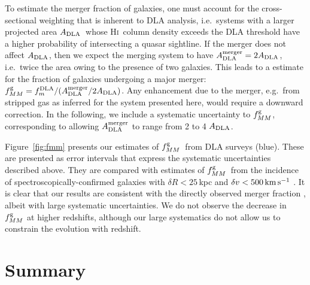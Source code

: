 \documentclass[twocolumn]{aastex62}
\newcommand{\mrperp}{R}
\newcommand{\mfmdla}{f_m^{\rm DLA}}    %
\newcommand{\madla}{A_{\rm DLA}}  %
\newcommand{\adla}{$\madla$}
\newcommand{\mfmg}{f_{MM}^{\rm g}}    %
\newcommand{\fmg}{$\mfmg$}
\newcommand{\mkms}{\rm km \, s^{-1}}
\newcommand{\hi}{H\textsc{i}}
\begin{document}
To estimate the merger fraction of galaxies, one must account for the 
cross-sectional weighting that is inherent to DLA analysis, i.e.\ systems with 
a larger projected area \adla\ whose \hi\ column density exceeds the DLA threshold 
have a higher probability of intersecting a quasar sightline. If the merger does 
not affect \adla, then we expect the merging system to have $\madla^{\rm merger} = 
2 \madla$, i.e.\ twice the area owing to the presence of two galaxies. 
This leads to a estimate for the fraction of galaxies undergoing a major 
merger: $\mfmg = \mfmdla / (\madla^{\rm merger} / 2 \madla)$.
Any enhancement due to the merger, e.g.\ from stripped gas as inferred for the 
system presented here, would require a downward correction. In the following, we 
include a systematic uncertainty to $\mfmg$, corresponding to  allowing 
$\madla^{\rm merger}$ to range from 2 to 4 \adla.


%

Figure~\ref{fig:fmm} presents our estimates of \fmg\ from DLA surveys (blue).  These 
are presented as error intervals that express the systematic uncertainties described 
above. They are compared with estimates of \fmg\ from the incidence of 
spectroscopically-confirmed galaxies with $\delta \mrperp < 25$\,kpc and 
$\delta v < 500 \, \mkms$ \citep[green; ][]{ventou+2017}. It is clear that our 
results are consistent with the directly observed merger fraction \citep{ventou+2019}, 
albeit with large systematic uncertainties. We do not observe the decrease in $\mfmg$ 
at higher redshifts, although our large systematics do not allow us to constrain the 
evolution with redshift.

\section{Summary}
\label{sec:conclude}
\end{document}
